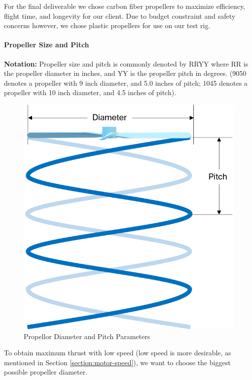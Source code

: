 For the final deliverable we chose carbon fiber propellers to maximize efficiency, flight time, and longevity for our client. Due to budget constraint and safety concerns however, we chose plastic propellers for use on our test rig.

\paragraph{Propeller Size and Pitch}

\textbf{Notation: } Propeller size and pitch is commonly denoted by RRYY where RR is the propeller diameter in inches, and YY is the propeller pitch in degrees. (9050 denotes a propeller with 9 inch diameter, and 5.0 inches of pitch; 1045 denotes a propeller with 10 inch diameter, and 4.5 inches of pitch).

\begin{figure}[h]
    \centering
    \includegraphics[scale=0.5]{img/proppitch}
    \caption{Propellor Diameter and Pitch Parameters}
    \label{fig:propeller}
\end{figure}

To obtain maximum thrust with low speed (low speed is more desirable, as mentioned in Section \ref{section:motor-speed}), we want to choose the biggest possible propeller diameter.

